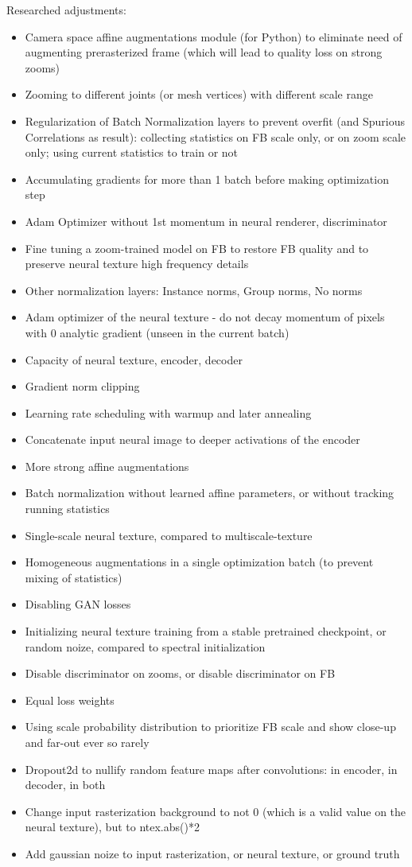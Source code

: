 Researched adjustments:
\begin{itemize}
	\item Camera space affine augmentations module (for Python) to eliminate need of augmenting prerasterized frame (which will lead to quality loss on strong zooms)
	\item Zooming to different joints (or mesh vertices) with different scale range 
	\item Regularization of Batch Normalization layers to prevent overfit (and Spurious Correlations as result): collecting statistics on FB scale only, or on zoom scale only; using current statistics to train or not
	\item Accumulating gradients for more than 1 batch before making optimization step
	\item Adam Optimizer without 1st momentum in neural renderer, discriminator
	\item Fine tuning a zoom-trained model on FB to restore FB quality and to preserve neural texture high frequency details
	\item Other normalization layers: Instance norms, Group norms, No norms
	\item Adam optimizer of the neural texture - do not decay momentum of pixels with 0 analytic gradient (unseen in the current batch)
	\item Capacity of neural texture, encoder, decoder
	\item Gradient norm clipping
	\item Learning rate scheduling with warmup and later annealing
	\item Concatenate input neural image to deeper activations of the encoder
	\item More strong affine augmentations 
	\item Batch normalization without learned affine parameters, or without tracking running statistics 
	\item Single-scale neural texture, compared to multiscale-texture
	\item Homogeneous augmentations in a single optimization batch (to prevent mixing of statistics)
	\item Disabling GAN losses
	\item Initializing neural texture training from a stable pretrained checkpoint, or random noize, compared to spectral initialization
	\item Disable discriminator on zooms, or disable discriminator on FB
	\item Equal loss weights
	\item Using scale probability distribution to prioritize FB scale and show close-up and far-out ever so rarely
	\item Dropout2d to nullify random feature maps after convolutions: in encoder, in decoder, in both
	\item Change input rasterization background to not 0 (which is a valid value on the neural texture), but to ntex.abs()*2
	\item Add gaussian noize to input rasterization, or neural texture, or ground truth
	
\end{itemize}